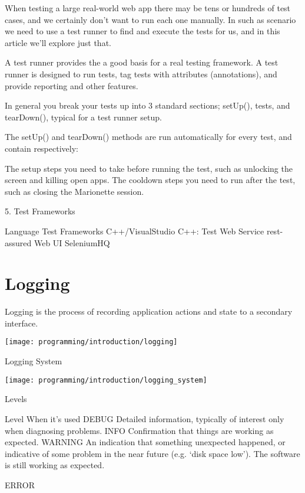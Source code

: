 When testing a large real-world web app there may be tens or hundreds of test cases, and we certainly don't want to run each one manually. In such as scenario we need to use a test runner to find and execute the tests for us, and in this article we'll explore just that.

A test runner provides the a good basis for a real testing framework. A test runner is designed to run tests, tag tests with attributes (annotations), and provide reporting and other features.

In general you break your tests up into 3 standard sections; setUp(), tests, and tearDown(), typical for a test runner setup.

The setUp() and tearDown() methods are run automatically for every test, and contain respectively:

The setup steps you need to take before running the test, such as unlocking the screen and killing open apps.
The cooldown steps you need to run after the test, such as closing the Marionette session.

5. Test Frameworks

Language	Test Frameworks
C++/VisualStudio	C++: Test
Web Service	rest-assured
Web UI	SeleniumHQ

\section{Logging}

Logging is the process of recording application actions and state to a secondary interface.

\texttt{[image: programming/introduction/logging]}

Logging System

\texttt{[image: programming/introduction/logging\_system]}

Levels

Level	When it’s used
DEBUG	Detailed information, typically of interest only when diagnosing problems.
INFO	Confirmation that things are working as expected.
WARNING	An indication that something unexpected happened, or indicative of some problem in the near future (e.g. ‘disk space low’). The software is still working as expected.

ERROR

